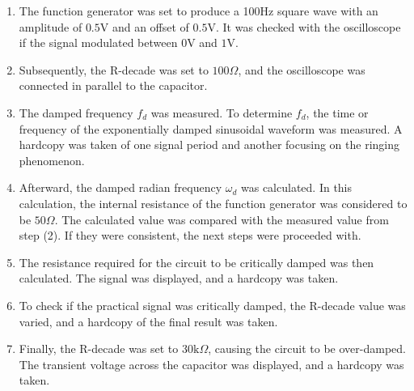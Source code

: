 \begin{enumerate}
    \item The function generator was set to produce a 100Hz square wave with an amplitude of $0.5\text{V}$ and an offset of $0.5\text{V}$. It was checked with the oscilloscope if the signal modulated between $0\text{V}$ and $1\text{V}$.

    \item Subsequently, the R-decade was set to $100\Omega$, and the oscilloscope was connected in parallel to the capacitor.

    \item The damped frequency $f_d$ was measured. To determine $f_d$, the time or frequency of the exponentially damped sinusoidal waveform was measured. A hardcopy was taken of one signal period and another focusing on the ringing phenomenon.

    \item Afterward, the damped radian frequency $\omega_d$ was calculated. In this calculation, the internal resistance of the function generator was considered to be $50\Omega$. The calculated value was compared with the measured value from step (2). If they were consistent, the next steps were proceeded with.

    \item The resistance required for the circuit to be critically damped was then calculated. The signal was displayed, and a hardcopy was taken.

    \item To check if the practical signal was critically damped, the R-decade value was varied, and a hardcopy of the final result was taken.

    \item Finally, the R-decade was set to $30\text{k}\Omega$, causing the circuit to be over-damped. The transient voltage across the capacitor was displayed, and a hardcopy was taken.
\end{enumerate}

